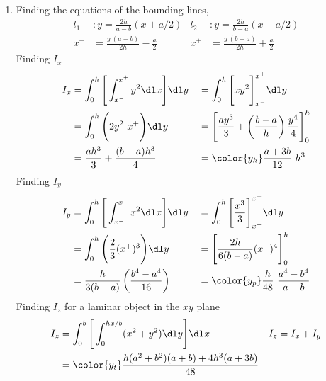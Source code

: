 \begin{enumerate}
    \item Finding the equations of the bounding lines,
          \begin{align}
              l_1 & : y = \frac{2h}{a - b}(x + a/2)     &
              l_2 & : y = \frac{2h}{b-a}(x - a/2)         \\
              x^- & = \frac{y\ (a-b)}{2h} - \frac{a}{2} &
              x^+ & = \frac{y\ (b-a)}{2h} + \frac{a}{2}
          \end{align}
          Finding $ I_x $
          \begin{align}
              I_x   & = \int_{0}^{h} \Bigg[\int_{x^-}^{x^+} y^2 \dl x \Bigg]
              \dl y &
                    & = \int_{0}^{h} \Bigg[ xy^2\Bigg]_{x^-}^{x^+}
              \dl y                                                            \\
                    & = \int_{0}^{h} \Bigg(2y^2\ x^+\Bigg) \dl y             &
                    & = \Bigg[ \frac{ay^3}{3} + \left( \frac{b-a}{h} \right)
              \frac{y^4}{4} \Bigg]_{0}^{h}                                     \\
                    & = \frac{ah^3}{3} + \frac{(b-a)h^3}{4}                  &
                    & = \color{y_h} \frac{a + 3b}{12}\ h^3
          \end{align}
          Finding $ I_y $
          \begin{align}
              I_y   & = \int_{0}^{h} \Bigg[\int_{x^-}^{x^+} x^2 \dl x \Bigg]
              \dl y &
                    & = \int_{0}^{h} \Bigg[ \frac{x^3}{3} \Bigg]_{x^-}^{x^+}
              \dl y                                                            \\
                    & = \int_{0}^{h} \Bigg(\frac{2}{3} (x^+)^3\Bigg) \dl y   &
                    & = \Bigg[ \frac{2h}{6(b-a)} (x^+)^4 \Bigg]_{0}^{h}        \\
                    & = \frac{h}{3(b-a)} \left( \frac{b^4 - a^4}{16} \right) &
                    & = \color{y_p} \frac{h}{48}\ \frac{a^4 - b^4}{a - b}
          \end{align}
          Finding $ I_z $ for a laminar object in the $ xy $ plane
          \begin{align}
              I_z   & = \int_{0}^{b} \Bigg[\int_{0}^{hx/b} (x^2 + y^2) \dl y\Bigg]
              \dl x &
              I_z   & = I_x + I_y                                                  \\
                    & = \color{y_t} \frac{h(a^2 + b^2)(a+b) + 4h^3 (a + 3b)}{48}
          \end{align}

\end{enumerate}